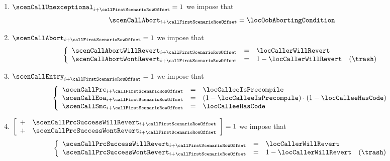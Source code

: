 \begin{description}
\begin{enumerate}
			\item
				\If $\scenCallUnexceptional _{i + \callFirstScenarioRowOffset} = 1$
				\Then we impose that
				\[ \scenCallAbort _{i + \callFirstScenarioRowOffset} = \locOobAbortingCondition \]
			\item
				\If $\scenCallAbort _{i + \callFirstScenarioRowOffset} = 1$
				\Then we impose that
				\[
					\left\{ \begin{array}{lclr}
						\scenCallAbortWillRevert _{i + \callFirstScenarioRowOffset} & = & \locCallerWillRevert                \\
						\scenCallAbortWontRevert _{i + \callFirstScenarioRowOffset} & = & 1 - \locCallerWillRevert & (\trash) \\
					\end{array} \right.
				\]
			\item
				\If $\scenCallEntry         _{i + \callFirstScenarioRowOffset} = 1$
				\Then we impose that
				\[
					\left\{ \begin{array}{lcl}
						\scenCallPrc _{i + \callFirstScenarioRowOffset} & = & \locCalleeIsPrecompile                                     \\
						\scenCallEoa _{i + \callFirstScenarioRowOffset} & = & (1 - \locCalleeIsPrecompile) \cdot (1 - \locCalleeHasCode) \\
						\scenCallSmc _{i + \callFirstScenarioRowOffset} & = & \locCalleeHasCode                                          \\
					\end{array} \right.
				\]
			\item \If
				$\left[ \begin{array}{cl}
					+ & \scenCallPrcSuccessWillRevert _{i + \callFirstScenarioRowOffset} \\
					+ & \scenCallPrcSuccessWontRevert _{i + \callFirstScenarioRowOffset} \\
				\end{array} \right] = 1$
				\Then we impose that
				\[
					\left\{ \begin{array}{lclr}
						\scenCallPrcSuccessWillRevert _{i + \callFirstScenarioRowOffset} & = & \locCallerWillRevert     \\
						\scenCallPrcSuccessWontRevert _{i + \callFirstScenarioRowOffset} & = & 1 - \locCallerWillRevert  & (\trash) \\
					\end{array} \right.
\]
\end{enumerate}
\end{description}
